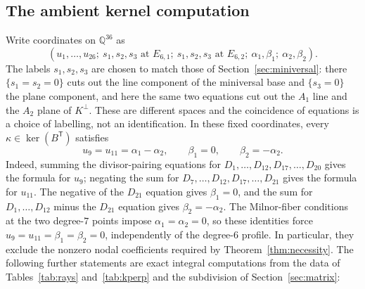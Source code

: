 \documentclass[11pt]{amsart}
\theoremstyle{definition}
\theoremstyle{remark}
\theoremstyle{plain}
\newcommand{\QQ}{\mathbb{Q}}
\begin{document}
\subsection{The ambient kernel computation}\label{sec:kernelcomp}
Write coordinates on $\QQ^{36}$ as
\[
(u_1,\dots,u_{26};\ s_{1},s_{2},s_{3}\text{ at }E_{6,1};\
s_{1},s_{2},s_{3}\text{ at }E_{6,2};\ \alpha_1,\beta_1;\
\alpha_2,\beta_2).
\]
The labels $s_1,s_2,s_3$ are chosen to match those of
Section~\ref{sec:miniversal}: there $\{s_1=s_2=0\}$ cuts out the line
component of the miniversal base and $\{s_3=0\}$ the plane component, and here
the same two equations cut out the $A_1$ line and the $A_2$ plane of
$K^{\perp}$.  These are different spaces and the coincidence of equations is a
choice of labelling, not an identification.
In these fixed coordinates, every $\kappa\in\ker(B^{\mathsf T})$ satisfies
\[
u_9=u_{11}=\alpha_1-\alpha_2,\qquad
\beta_1=0,\qquad \beta_2=-\alpha_2.
\]
Indeed, summing the divisor-pairing equations for
$D_1,\dots,D_{12},D_{17},\dots,D_{20}$ gives the formula for $u_9$;
negating the sum for $D_7,\dots,D_{12},D_{17},\dots,D_{21}$ gives
the formula for $u_{11}$.  The negative of the $D_{21}$ equation gives
$\beta_1=0$, and the sum for $D_1,\dots,D_{12}$ minus the $D_{21}$
equation gives $\beta_2=-\alpha_2$.
The Milnor-fiber conditions at the two degree-$7$ points impose
$\alpha_1=\alpha_2=0$, so these identities force
$u_9=u_{11}=\beta_1=\beta_2=0$, independently of the degree-$6$ profile.
In particular, they exclude the nonzero nodal coefficients required by
Theorem~\ref{thm:necessity}.
The following further statements are exact integral computations from the data of
Tables~\ref{tab:rays} and~\ref{tab:kperp} and the subdivision of
Section~\ref{sec:matrix}:
\end{document}
